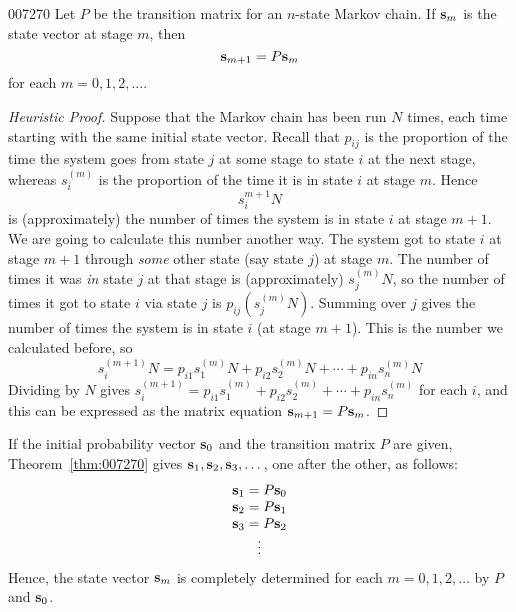 \begin{theorem}{}{007270}
Let $P$ be the transition matrix for an $n$-state Markov chain. If $\textbf{s}_{m}$ is the state vector at stage $m$, then
\begin{equation*}
\textbf{s}_{m+1} = P\textbf{s}_m
\end{equation*}
for each $m = 0, 1, 2, \dots$.
\end{theorem}

\begin{proof}[Heuristic Proof]
Suppose that the Markov chain has been run $N$ times, each time starting with the same initial state vector. Recall that $p_{ij}$ is the proportion of the time the system goes from state $j$ at some stage to state $i$ at the next stage, whereas $s_{i}^{(m)}$ is the proportion of the time it is in state $i$ at stage $m$. Hence
\begin{equation*}
s_{i}^{m+1}N
\end{equation*}
is (approximately) the number of times the system is in state $i$ at stage $m + 1$. We are going to calculate this number another way. The system got to state $i$ at stage $m + 1$ through \textit{some} other state (say state $j$) at stage $m$. The number of times it was \textit{in} state $j$ at that stage is (approximately) $s_{j}^{(m)}N$, so the number of times it got to state $i$ via state $j$ is $p_{ij}(s_{j}^{(m)}N)$. Summing over $j$ gives the number of times the system is in state $i$ (at stage $m + 1$). This is the number we calculated before, so
\begin{equation*}
s_{i}^{(m+1)}N = p_{i1}s_{1}^{(m)}N + p_{i2}s_{2}^{(m)}N + \cdots + p_{in}s_{n}^{(m)}N
\end{equation*}
Dividing by $N$ gives $s_{i}^{(m+1)} = p_{i1}s_{1}^{(m)} + p_{i2}s_{2}^{(m)} + \cdots + p_{in}s_{n}^{(m)}$ for each $i$, and this can be expressed as the matrix equation $\textbf{s}_{m+1} = P\textbf{s}_{m}$.
\end{proof}

If the initial probability vector $\textbf{s}_{0}$ and the transition matrix $P$ are given, Theorem~\ref{thm:007270} gives $\textbf{s}_{1}, \textbf{s}_{2}, \textbf{s}_{3}, \dots$, one after the other, as follows:
\begin{equation*}
\begin{array}{c}
\textbf{s}_{1} = P\textbf{s}_0 \\
\textbf{s}_{2} = P\textbf{s}_1 \\
\textbf{s}_{3} = P\textbf{s}_2 \\
\vdots
\end{array}
\end{equation*}
Hence, the state vector $\textbf{s}_{m}$ is completely determined for each $m = 0, 1, 2, \dots$ by $P$ and $\textbf{s}_{0}$.



